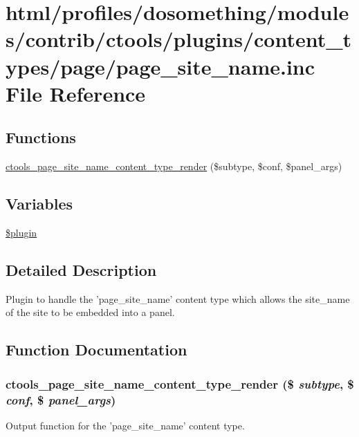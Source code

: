 \hypertarget{page__site__name_8inc}{
\section{html/profiles/dosomething/modules/contrib/ctools/plugins/content\_\-types/page/page\_\-site\_\-name.inc File Reference}
\label{page__site__name_8inc}
}
\subsection*{Functions}
\begin{DoxyCompactItemize}
\item 
\hyperlink{page__site__name_8inc_a6311b5be5595d3754e1aa301e8b065c2}{ctools\_\-page\_\-site\_\-name\_\-content\_\-type\_\-render} (\$subtype, \$conf, \$panel\_\-args)
\end{DoxyCompactItemize}
\subsection*{Variables}
\begin{DoxyCompactItemize}
\item 
\hyperlink{page__site__name_8inc_ada8a7130088351710bb02ed622d6bf65}{\$plugin}
\end{DoxyCompactItemize}


\subsection{Detailed Description}
Plugin to handle the 'page\_\-site\_\-name' content type which allows the site\_\-name of the site to be embedded into a panel. 

\subsection{Function Documentation}
\hypertarget{page__site__name_8inc_a6311b5be5595d3754e1aa301e8b065c2}{
\subsubsection[{ctools\_\-page\_\-site\_\-name\_\-content\_\-type\_\-render}]{\setlength{\rightskip}{0pt plus 5cm}ctools\_\-page\_\-site\_\-name\_\-content\_\-type\_\-render (\$ {\em subtype}, \/  \$ {\em conf}, \/  \$ {\em panel\_\-args})}}
\label{page__site__name_8inc_a6311b5be5595d3754e1aa301e8b065c2}
Output function for the 'page\_\-site\_\-name' content type.

